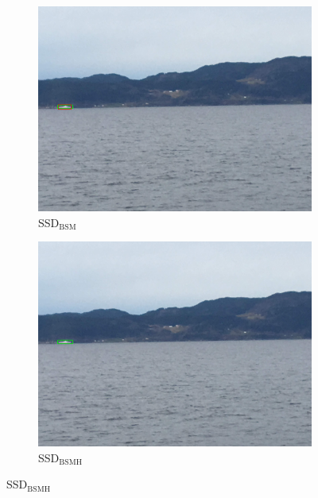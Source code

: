 \begin{figure}[h!]
\begin{subfigure}{.5\textwidth}
  \centering
  \includegraphics[width=0.8\linewidth]{results/case_buildings/ssdtrf/ssd2/2better/IMG_2262.jpg}
  \caption{SSD$_{\text{BSM}}$}
\end{subfigure}%
\begin{subfigure}{.5\textwidth}
  \centering
  \includegraphics[width=.8\linewidth]{results/case_buildings/ssdtrf/ssd3/2better/IMG_2262.jpg}
  \caption{SSD$_{\text{BSMH}}$}
\end{subfigure}


\end{figure}
